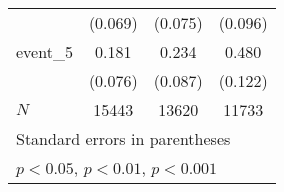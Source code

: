 {\begin{tabular}{l*{3}{c}}
            &     (0.069)         &     (0.075)         &     (0.096)         \\
[1em]
event\_5     &       0.181\sym{*}  &       0.234\sym{**} &       0.480\sym{***}\\
            &     (0.076)         &     (0.087)         &     (0.122)         \\
\hline
\(N\)       &       15443         &       13620         &       11733         \\
\hline\hline
\multicolumn{4}{l}{\footnotesize Standard errors in parentheses}\\
\multicolumn{4}{l}{\footnotesize \sym{*} \(p<0.05\), \sym{**} \(p<0.01\), \sym{***} \(p<0.001\)}\\
\end{tabular}
}
